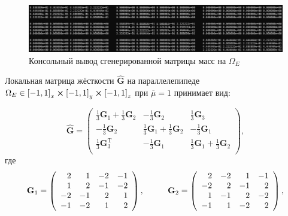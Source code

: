 \begin{figure}
	\centering
	\vspace*{0.7cm}
	\includegraphics[width=1.0\linewidth]{images/M.png}
	\caption{Консольный вывод сгенерированной матрицы масс на $\Omega_E$}
	\label{fig:GeneratedMatrixMass}
\end{figure}

Локальная матрица жёсткости $\hat{\textbf{G}}$ на параллелепипеде $\Omega_E \in \left[-1, 1\right]_x \cross \left[-1, 1\right]_y \cross \left[-1, 1\right]_z$ при $\overline{\mu} = 1$ принимает вид:

\begin{equation*}
	\hat{\textbf{G}} = \left(
	\begin{array}{ccc}
		\frac{1}{3}\textbf{G}_1 + \frac{1}{3}\textbf{G}_2 & -\frac{1}{3}\textbf{G}_2 & \frac{1}{3}\textbf{G}_3 \\
		-\frac{1}{3}\textbf{G}_2 & \frac{1}{3}\textbf{G}_1 + \frac{1}{3}\textbf{G}_2 & -\frac{1}{3}\textbf{G}_1 \\
		\frac{1}{3}\textbf{G}^\text{T}_3 & -\frac{1}{3}\textbf{G}_1 & \frac{1}{3}\textbf{G}_1 + \frac{1}{3}\textbf{G}_2 \\
	\end{array}
	\right),
\end{equation*}
где
\begin{equation*}
	\textbf{G}_1 = \left(
	\begin{array}{rrrr}
		2 & 1 & -2 & -1 \\
		1 & 2 & -1 & -2 \\
		-2 & -1 & 2 & 1 \\
		-1 & -2 & 1 & 2 \\
	\end{array}
	\right),
	\hspace{10mm}
	\textbf{G}_2 = \left(
	\begin{array}{rrrr}
		2 & -2 & 1 & -1 \\
		-2 & 2 & -1 & 2 \\
		1 & -1 & 2 & -2 \\
		-1 & 1 & -2 & 2 \\
	\end{array}
	\right),
\end{equation*}

